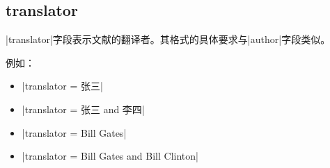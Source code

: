 
\subsection{translator}\label{subsec:translator}

|translator|字段表示文献的翻译者。其格式的具体要求与|author|字段类似。

例如：
\begin{itemize}
\item |translator = {张三}|
\item |translator = {张三 and 李四}|
\item |translator = {Bill Gates}|
\item |translator = {Bill Gates and Bill Clinton}|
\end{itemize}

